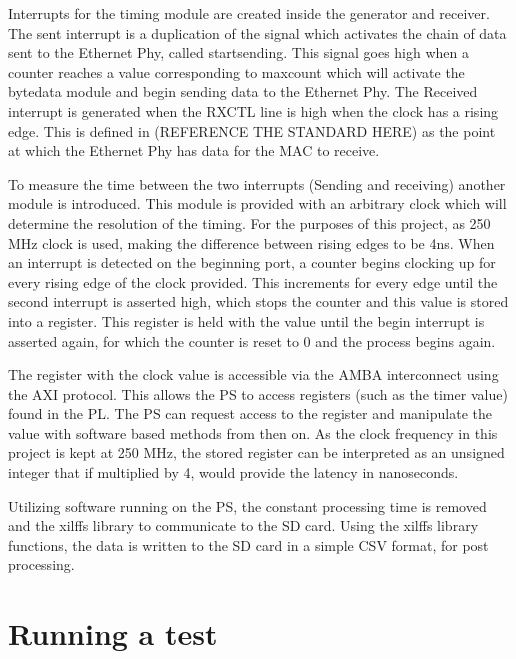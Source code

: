 Interrupts for the timing module are created inside the generator and receiver. The sent interrupt is a duplication 
of the signal which activates the chain of data sent to the Ethernet Phy, called start\textunderscore sending. This 
signal goes high when a counter reaches a value corresponding to max\textunderscore count which will activate the 
byte\textunderscore data module and begin sending data to the Ethernet Phy. The Received interrupt is generated when 
the RX\textunderscore CTL line is high when the clock has a rising edge. This is defined in (REFERENCE THE STANDARD 
HERE) as the point at which the Ethernet Phy has data for the MAC to receive. 

To measure the time between the two interrupts (Sending and receiving) another module is introduced. This module is 
provided with an arbitrary clock which will determine the resolution of the timing. For the purposes of this project,
as 250 MHz clock is used, making the difference between rising edges to be 4ns. When an interrupt is detected on 
the beginning port, a counter begins clocking up for every rising edge of the clock provided. This increments for 
every edge until the second interrupt is asserted high, which stops the counter and this value is stored into a 
register. This register is held with the value until the begin interrupt is asserted again, for which the counter is 
reset to 0 and the process begins again.

The register with the clock value is accessible via the AMBA interconnect using the AXI protocol. This allows the PS 
to access registers (such as the timer value) found in the PL. The PS can request access to the register and 
manipulate the value with software based methods from then on. As the clock frequency in this project is kept at 250 
MHz, the stored register can be interpreted as an unsigned integer that if multiplied by 4, would provide the latency 
in nanoseconds. 

Utilizing software running on the PS, the constant processing time is removed and the xilffs library to communicate 
to the SD card. Using the xilffs library functions, the data is written to the SD card in a simple CSV format, for 
post processing.

\section{Running a test}

%

%

%
